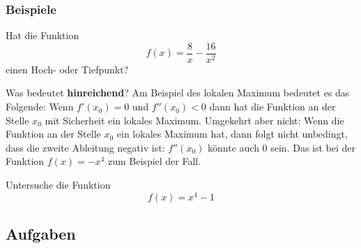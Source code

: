 \subsubsection{Beispiele}
\begin{example}
    Hat die Funktion \[f(x)=\dfrac{8}{x}- \dfrac{16}{x^2}\] einen Hoch- oder Tiefpunkt?
\end{example}
\newpage
Was bedeutet \textbf{hinreichend}? Am Beispiel des lokalen Maximum bedeutet es das Folgende: Wenn $f'\left(x_0\right)=0$ und $f''\left(x_0\right)<0$ dann hat die Funktion an der Stelle $x_0$ mit Sicherheit ein lokales Maximum. Umgekehrt aber nicht: Wenn die Funktion an der Stelle $x_0$ ein lokales Maximum hat, dann folgt nicht unbedingt, dass die zweite Ableitung negativ ist: $f''(x_0)$ könnte auch $0$ sein. Das ist bei der Funktion $f\left(x\right)=-x^4$ zum Beispiel der Fall.
\begin{example}
    Untersuche die Funktion \[f(x)=x^4-1\]
\end{example}
\newpage
\subsection{Aufgaben}




